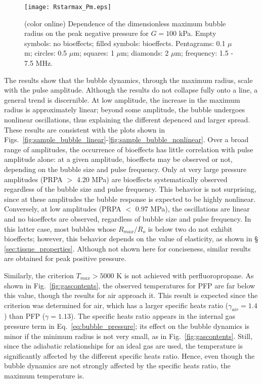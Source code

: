 \documentclass[%
preprint,%
author-year,%
]{jasatex}
\begin{document}
\begin{figure}[t]
  \texttt{[image: Rstarmax\_Pm.eps]}
  \caption{(color online) Dependence of the dimensionless maximum bubble radius on
    the peak negative pressure for $G=100$ kPa.  Empty symbols: no
    bioeffects; filled symbols: bioeffects. Pentagrams: 0.1 $\mu$m; circles:
    0.5 $\mu$m; squares: 1 $\mu$m; diamonds: 2 $\mu$m; frequency: 1.5 - 7.5 MHz. }
  \label{fig:amplitude}
\end{figure}

The results show that the bubble dynamics, through the maximum radius,
scale with the pulse amplitude. Although the results do not collapse fully
onto a line, a general trend is discernible. At low amplitude, the increase in
the maximum radius is approximately linear; beyond some amplitude, the bubble undergoes
nonlinear oscillations, thus explaining the different depenced and larger spread. 
These results are consistent with the plots shown in 
Figs.~\ref{fig:sample_bubble_linear}-\ref{fig:sample_bubble_nonlinear}.
Over a broad range of amplitudes, the
occurrence of bioeffects has little correlation with pulse amplitude
alone: at a given amplitude, bioeffects may be observed or not,
depending on the bubble size and pulse frequency.  Only at very large
pressure amplitudes (PRPA $>$ 4.20 MPa) are bioeffects systematically observed regardless of the
bubble size and pulse frequency. This behavior is not surprising, since at
these amplitudes the bubble response is expected to be highly
nonlinear. Conversely, at low amplitudes (PRPA $<$ 0.97 MPa), the oscillations are 
linear and no bioeffects are observed, regardless of
bubble size and pulse frequency. In this latter case, most bubbles
whose $R_{max}/R_o$ is below two do not exhibit bioeffects; however,
this behavior depends on the value of elasticity, as shown in \S
\ref{sec:tissue_properties}.  Although not shown here for conciseness,
similar results are obtained for peak positive pressure.


Similarly, the criterion $T_{max} > 5000$ K is not achieved with perfluoropropane.
As shown in Fig.~\ref{fig:gascontents}, the observed temperatures for
PFP are far below this value, though the results for air approach it. This
result is expected since the criterion was determined for air, which
has a larger specific heats ratio ($\gamma_{air}=1.4$) than
PFP ($\gamma= 1.13$). The specific heats ratio appears in
the internal gas pressure term in Eq.~\ref{eq:bubble_pressure}; its
effect on the bubble dynamics is minor if the minimum radius is not
very small, as in Fig.~\ref{fig:gascontents}. Still, since the
adiabatic relationships for an ideal gas are used, the temperature is
significantly affected by the different specific heats ratio. Hence,
even though the bubble dynamics are not strongly affected by the
specific heats ratio, the maximum temperature is.
\end{document}

